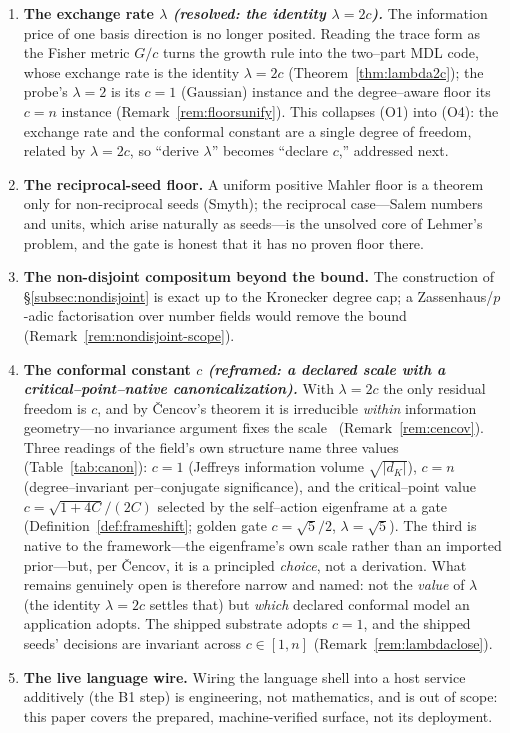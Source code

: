 \documentclass[11pt]{article}
\theoremstyle{plain}
\theoremstyle{definition}
\theoremstyle{remark}
\newcommand{\K}{K}
\newcommand{\GG}{G}
\begin{document}
\begin{enumerate}[label=(O\arabic*),leftmargin=*]
  \item \textbf{The exchange rate $\lambda$ \emph{(resolved: the identity $\lambda=2c$).}} The information price
        of one basis direction is no longer posited. Reading the trace form as the Fisher metric $\GG/c$ turns the
        growth rule into the two--part MDL code, whose exchange rate is the identity $\lambda=2c$
        (Theorem~\ref{thm:lambda2c}); the probe's $\lambda=2$ is its $c=1$ (Gaussian) instance and the
        degree--aware floor its $c=n$ instance (Remark~\ref{rem:floorsunify}). This collapses (O1) into (O4): the
        exchange rate and the conformal constant are a single degree of freedom, related by $\lambda=2c$, so
        ``derive $\lambda$'' becomes ``declare $c$,'' addressed next.
  \item \textbf{The reciprocal-seed floor.} A uniform positive Mahler floor is a theorem only for
        non-reciprocal seeds (Smyth); the reciprocal case---Salem numbers and units, which arise naturally as
        seeds---is the unsolved core of Lehmer's problem, and the gate is honest that it has no proven floor
        there.
  \item \textbf{The non-disjoint compositum beyond the bound.} The construction of \S\ref{subsec:nondisjoint}
        is exact up to the Kronecker degree cap; a Zassenhaus/$p$-adic factorisation over number fields would
        remove the bound (Remark~\ref{rem:nondisjoint-scope}).
  \item \textbf{The conformal constant $c$ \emph{(reframed: a declared scale with a critical--point--native
        canonicalization).}} With $\lambda=2c$ the only residual freedom is $c$, and by \v{C}encov's theorem it is
        irreducible \emph{within} information geometry---no invariance argument fixes the scale~\cite{Cencov}
        (Remark~\ref{rem:cencov}). Three readings of the field's own structure name three values
        (Table~\ref{tab:canon}): $c=1$ (Jeffreys information volume $\sqrt{|d_\K|}$), $c=n$ (degree--invariant
        per--conjugate significance), and the critical--point value $c=\sqrt{1+4C}/(2C)$ selected by the
        self--action eigenframe at a gate (Definition~\ref{def:frameshift}; golden gate $c=\sqrt5/2$,
        $\lambda=\sqrt5$). The third is native to the framework---the eigenframe's own scale rather than an
        imported prior---but, per \v{C}encov, it is a principled \emph{choice}, not a derivation. What remains
        genuinely open is therefore narrow and named: not the \emph{value} of $\lambda$ (the identity
        $\lambda=2c$ settles that) but \emph{which} declared conformal model an application adopts. The shipped
        substrate adopts $c=1$, and the shipped seeds' decisions are invariant across $c\in[1,n]$
        (Remark~\ref{rem:lambdaclose}).
  \item \textbf{The live language wire.} Wiring the language shell into a host service additively (the B1
        step) is engineering, not mathematics, and is out of scope: this paper covers the prepared,
        machine-verified surface, not its deployment.
\end{enumerate}
\end{document}
